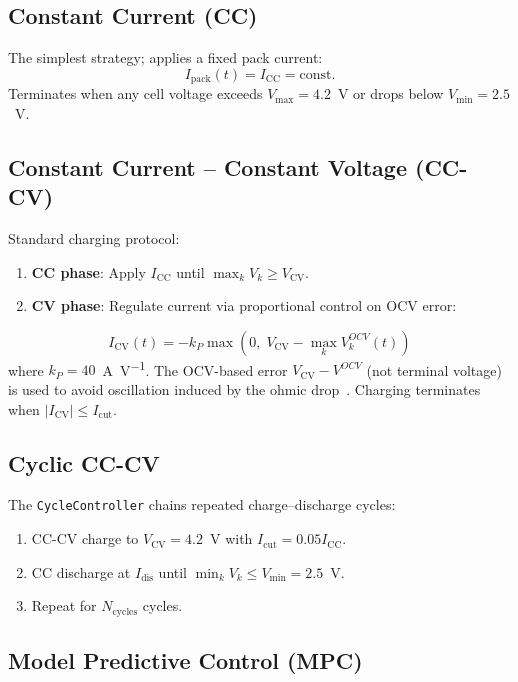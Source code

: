 \subsection{Constant Current (CC)}

The simplest strategy; applies a fixed pack current:
\begin{equation}
  I_\text{pack}(t) = I_\text{CC} = \text{const.}
  \label{eq:cc_control}
\end{equation}
Terminates when any cell voltage exceeds $V_\text{max} = 4.2$~V or drops below $V_\text{min} = 2.5$~V.

\subsection{Constant Current -- Constant Voltage (CC-CV)}

Standard charging protocol:
\begin{enumerate}
  \item \textbf{CC phase}: Apply $I_\text{CC}$ until $\max_k V_k \geq V_\text{CV}$.
  \item \textbf{CV phase}: Regulate current via proportional control on OCV error:
\end{enumerate}
\begin{equation}
  I_\text{CV}(t) = -k_P \max(0,\; V_\text{CV} - \max_k V_k^{OCV}(t))
  \label{eq:cv_control}
\end{equation}
where $k_P = 40$~\si{\ampere\per\volt}. The OCV-based error $V_\text{CV} - V^{OCV}$ (not terminal voltage) is used to avoid oscillation induced by the ohmic drop~\cite{Plett2004}. Charging terminates when $|I_\text{CV}| \leq I_\text{cut}$.

\subsection{Cyclic CC-CV}

The \texttt{CycleController} chains repeated charge--discharge cycles:
\begin{enumerate}
  \item CC-CV charge to $V_\text{CV} = 4.2$~V with $I_\text{cut} = 0.05 I_\text{CC}$.
  \item CC discharge at $I_\text{dis}$ until $\min_k V_k \leq V_\text{min} = 2.5$~V.
  \item Repeat for $N_\text{cycles}$ cycles.
\end{enumerate}

\subsection{Model Predictive Control (MPC)}

